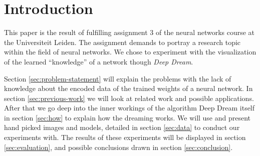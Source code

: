 \section{Introduction}
This paper is the result of fulfilling assignment 3 of the neural networks course at the Universiteit Leiden.
The assignment demands to portray a research topic within the field of neural networks.
We chose to experiment with the visualization of the learned \enquote{knowledge} of a network though \emph{Deep Dream}.

Section \ref{sec:problem-statement} will explain the problems with the lack of knowledge about the encoded data of the trained weights of a neural network.
In section \ref{sec:previous-work} we will look at related work and possible applications.
After that we go deep into the inner workings of the algorithm Deep Dream itself in section \ref{sec:how} to explain how the dreaming works.
We will use and present hand picked images and models, detailed in section \ref{sec:data} to conduct our experiments with. 
The results of these experiments will be displayed in section \ref{sec:evaluation}, and possible conclusions drawn in section \ref{sec:conclusion}.




